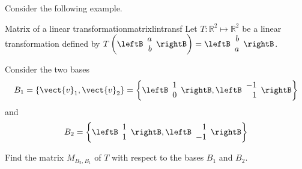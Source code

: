 Consider the following example.

\begin{example}{Matrix of a linear transformation}{matrixlintransf}
Let $T: \mathbb{R}^2 \mapsto \mathbb{R}^2$ be a linear transformation defined by $T \left( \leftB \begin{array}{r}
a \\
b
\end{array} \rightB \right) = \leftB \begin{array}{r}
b \\
a 
\end{array} \rightB$. 

Consider the two bases
\[
B_1 = \left\{ \vect{v}_{1}, \vect{v}_{2} \right\} = \left\{ \leftB \begin{array}{r}
1 \\
0
\end{array}\rightB, \leftB \begin{array}{r}
-1 \\
1
\end{array}
\rightB
\right\}
\]
 and 
\[
B_2 = \left\{ \leftB \begin{array}{r}
1 \\
1
\end{array}
\rightB, \leftB \begin{array}{r}
1 \\
-1
\end{array}
\rightB
\right\}
\]

Find the matrix $M_{B_2,B_1}$ of $T$ with respect to the bases $B_1$ and $B_2$. 
\end{example}

